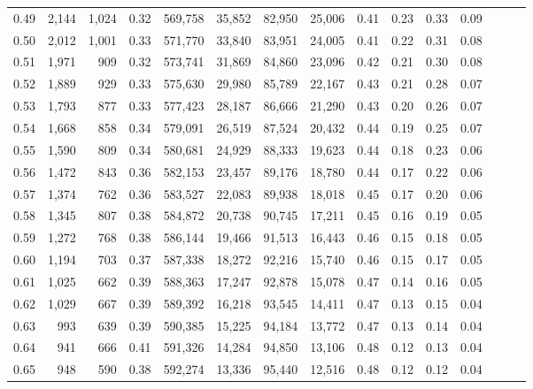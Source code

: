 \begin{tabular}{rrrrrrrrrrrrrrr}
0.49 &   2,144 &  1,024 &  0.32 &  569,758 &   35,852 &   82,950 &   25,006 &  0.41 &  0.23 &  0.33 &      0.09 \\
0.50 &   2,012 &  1,001 &  0.33 &  571,770 &   33,840 &   83,951 &   24,005 &  0.41 &  0.22 &  0.31 &      0.08 \\
0.51 &   1,971 &    909 &  0.32 &  573,741 &   31,869 &   84,860 &   23,096 &  0.42 &  0.21 &  0.30 &      0.08 \\
0.52 &   1,889 &    929 &  0.33 &  575,630 &   29,980 &   85,789 &   22,167 &  0.43 &  0.21 &  0.28 &      0.07 \\
0.53 &   1,793 &    877 &  0.33 &  577,423 &   28,187 &   86,666 &   21,290 &  0.43 &  0.20 &  0.26 &      0.07 \\
0.54 &   1,668 &    858 &  0.34 &  579,091 &   26,519 &   87,524 &   20,432 &  0.44 &  0.19 &  0.25 &      0.07 \\
0.55 &   1,590 &    809 &  0.34 &  580,681 &   24,929 &   88,333 &   19,623 &  0.44 &  0.18 &  0.23 &      0.06 \\
0.56 &   1,472 &    843 &  0.36 &  582,153 &   23,457 &   89,176 &   18,780 &  0.44 &  0.17 &  0.22 &      0.06 \\
0.57 &   1,374 &    762 &  0.36 &  583,527 &   22,083 &   89,938 &   18,018 &  0.45 &  0.17 &  0.20 &      0.06 \\
0.58 &   1,345 &    807 &  0.38 &  584,872 &   20,738 &   90,745 &   17,211 &  0.45 &  0.16 &  0.19 &      0.05 \\
0.59 &   1,272 &    768 &  0.38 &  586,144 &   19,466 &   91,513 &   16,443 &  0.46 &  0.15 &  0.18 &      0.05 \\
0.60 &   1,194 &    703 &  0.37 &  587,338 &   18,272 &   92,216 &   15,740 &  0.46 &  0.15 &  0.17 &      0.05 \\
0.61 &   1,025 &    662 &  0.39 &  588,363 &   17,247 &   92,878 &   15,078 &  0.47 &  0.14 &  0.16 &      0.05 \\
0.62 &   1,029 &    667 &  0.39 &  589,392 &   16,218 &   93,545 &   14,411 &  0.47 &  0.13 &  0.15 &      0.04 \\
0.63 &     993 &    639 &  0.39 &  590,385 &   15,225 &   94,184 &   13,772 &  0.47 &  0.13 &  0.14 &      0.04 \\
0.64 &     941 &    666 &  0.41 &  591,326 &   14,284 &   94,850 &   13,106 &  0.48 &  0.12 &  0.13 &      0.04 \\
0.65 &     948 &    590 &  0.38 &  592,274 &   13,336 &   95,440 &   12,516 &  0.48 &  0.12 &  0.12 &      0.04 \\

\end{tabular}

